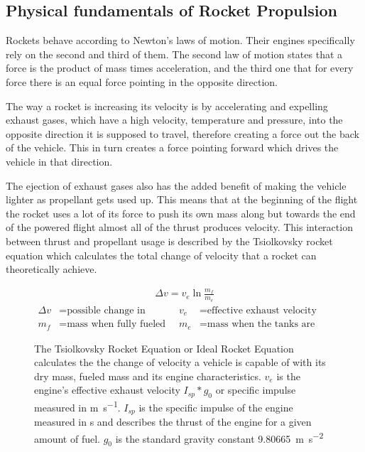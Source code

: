 \subsection{Physical fundamentals of Rocket Propulsion}

Rockets behave according to Newton's laws of motion. Their engines specifically rely on the second and third of them. The second law of motion states that a force is the product of mass times acceleration, and the third one that for every force there is an equal force pointing in the opposite direction. 

The way a rocket is increasing its velocity is by accelerating and expelling exhaust gases, which have a high velocity, temperature and pressure, into the opposite direction it is supposed to travel, therefore creating a force out the back of the vehicle. This in turn creates a force pointing forward which drives the vehicle in that direction.

The ejection of exhaust gases also has the added benefit of making the vehicle lighter as propellant gets used up. This means that at the beginning of the flight the rocket uses a lot of its force to push its own mass along but towards the end of the powered flight almost all of the thrust produces velocity.
This interaction between thrust and propellant usage is described by the Tsiolkovsky rocket equation which calculates the total change of velocity that a rocket can theoretically achieve.

\begin{figure}[h]
\begin{align*}
\Delta v=v_{e}\ln {\frac {m_{f}}{m_{e}}}
\end{align*}
\begin{align*}
\Delta v &= \text{possible change in velocity} & v_{e} &= \text{effective exhaust velocity} \\
m_{f} &= \text{mass when fully fueled} & m_{e} &= \text{mass when the tanks are empty}
\end{align*}
\caption{The Tsiolkovsky Rocket Equation or Ideal Rocket Equation calculates the the change of velocity a vehicle is capable of with its dry mass, fueled mass and its engine characteristics. $v_{e}$ is the engine's effective exhaust velocity $I_{sp}*g_{0}$ or specific impulse measured in \si[per-mode = fraction]{\meter\per\second}. $I_{sp}$ is the specific impulse of the engine measured in \si{\second} and describes the thrust of the engine for a given amount of fuel. $g_{0}$ is the standard gravity constant \SI[per-mode = fraction]{9.80665}{\meter\per\second\squared}}
\end{figure}

